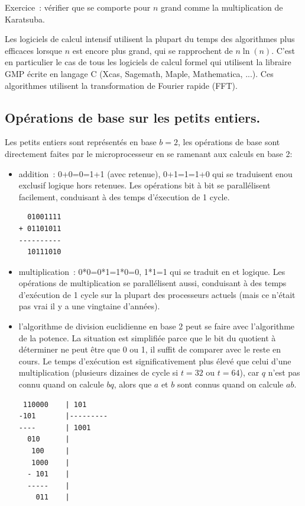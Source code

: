 \documentclass[a4paper,11pt]{book}
\begin{document}
\begin{giacjshere}
Exercice~: v\'erifier que  se comporte pour $n$ grand comme la multiplication
de Karatsuba.

Les logiciels de calcul intensif utilisent la plupart du temps des
algorithmes plus efficaces lorsque $n$ est encore plus grand, qui se
rapprochent de $n \ln(n)$. C'est en particulier le cas de tous les
logiciels de calcul formel qui
utilisent la libraire GMP \'ecrite en langage C (Xcas, 
Sagemath, Maple, Mathematica, ...). Ces algorithmes utilisent
la transformation de Fourier rapide (FFT).


\subsection{Op\'erations de base sur les petits entiers.}
Les petits entiers sont repr\'esent\'es en base $b=2$, les
op\'erations de base sont directement faites par le microprocesseur
en se ramenant aux calculs en base 2: 
\begin{itemize}
\item addition~: 0+0=0=1+1 (avec retenue), 
0+1=1=1+0 qui se traduisent enou exclusif
logique hors retenues. Les op\'erations bit \`a bit
se parall\'elisent facilement, conduisant \`a des temps
d'\'execution de 1 cycle.
\begin{verbatim}
  01001111
+ 01101011
----------
  10111010
\end{verbatim}
\item multiplication~: 0*0=0*1=1*0=0, 1*1=1
qui se traduit en et logique.
Les op\'erations de multiplication se parall\'elisent aussi,
conduisant \`a des temps d'ex\'ecution de 1 cycle sur la
plupart des processeurs actuels (mais ce n'\'etait pas vrai il
y a une vingtaine d'ann\'ees).
\item l'algorithme de division euclidienne en base 2
peut se faire avec l'algorithme de la potence. La situation
est simplifi\'ee parce que le bit du quotient \`a d\'eterminer
ne peut \^etre que 0 ou 1, il suffit de comparer avec le reste 
en cours. Le temps d'ex\'ecution est significativement plus
\'elev\'e que celui d'une multiplication (plusieurs dizaines de cycle
si $t=32$ ou $t=64$), car $q$ n'est pas connu quand on calcule
$bq$, alors que $a$ et $b$ sont connus quand on calcule $ab$.
\begin{verbatim}
 110000    | 101
-101       |---------
----       | 1001
  010      |
   100     |
   1000    |
  - 101    |
  -----    |
    011    |
\end{verbatim}
\end{itemize}


\end{giacjshere}
\end{document}
